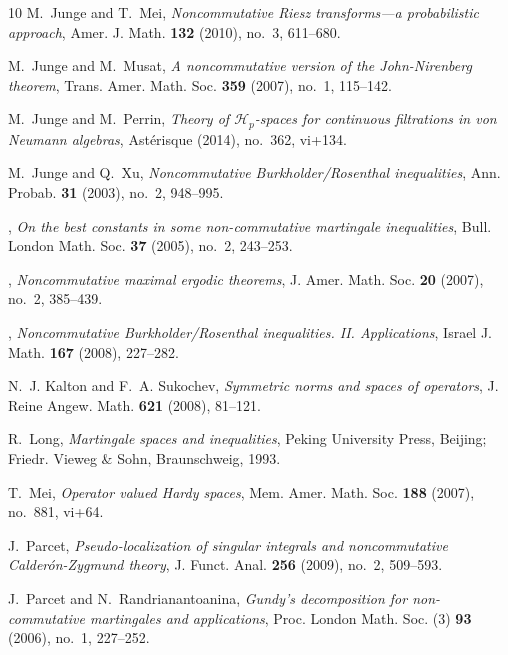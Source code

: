 \documentclass[11]{amsart}
\numberwithin{equation}{section}
\begin{document}
\begin{thebibliography}{10}
	M.~Junge and T.~Mei, \emph{Noncommutative {R}iesz transforms---a probabilistic
		approach}, Amer. J. Math. \textbf{132} (2010), no.~3, 611--680. 
	
	M.~Junge and M.~Musat, \emph{A noncommutative version of the {J}ohn-{N}irenberg
		theorem}, Trans. Amer. Math. Soc. \textbf{359} (2007), no.~1, 115--142.
	
	M.~Junge and M.~Perrin, \emph{Theory of {$\mathcal{H}_p$}-spaces for continuous
		filtrations in von {N}eumann algebras}, Ast\'{e}risque (2014), no.~362,
	vi+134. 
	
	M.~Junge and Q.~Xu, \emph{Noncommutative {B}urkholder/{R}osenthal
		inequalities}, Ann. Probab. \textbf{31} (2003), no.~2, 948--995. 
	
	\bysame, \emph{On the best constants in some non-commutative martingale
		inequalities}, Bull. London Math. Soc. \textbf{37} (2005), no.~2, 243--253.
	
	\bysame, \emph{Noncommutative maximal ergodic theorems}, J. Amer. Math. Soc.
	\textbf{20} (2007), no.~2, 385--439. 
	
	\bysame, \emph{Noncommutative {B}urkholder/{R}osenthal inequalities. {II}.
		{A}pplications}, Israel J. Math. \textbf{167} (2008), 227--282. 
	
	N.~J. Kalton and F.~A. Sukochev, \emph{Symmetric norms and spaces of
		operators}, J. Reine Angew. Math. \textbf{621} (2008), 81--121. 
	
	R.~Long, \emph{Martingale spaces and inequalities}, Peking University Press,
	Beijing; Friedr. Vieweg \& Sohn, Braunschweig, 1993. 
	
	T.~Mei, \emph{Operator valued {H}ardy spaces}, Mem. Amer. Math. Soc.
	\textbf{188} (2007), no.~881, vi+64. 
	
	J.~Parcet, \emph{Pseudo-localization of singular integrals and noncommutative
		{C}alder\'on-{Z}ygmund theory}, J. Funct. Anal. \textbf{256} (2009), no.~2,
	509--593. 
	
	J.~Parcet and N.~Randrianantoanina, \emph{Gundy's decomposition for
		non-commutative martingales and applications}, Proc. London Math. Soc. (3)
	\textbf{93} (2006), no.~1, 227--252. 
	

\end{thebibliography}
\end{document}
